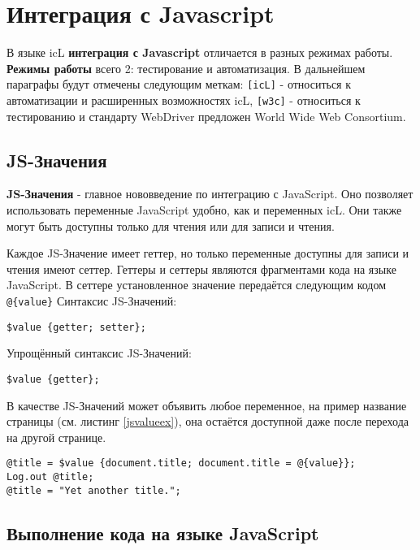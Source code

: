 \section{Интеграция с Javascript}

В языке icL {\bf интеграция с Javascript} отличается в разных режимах работы. {\bf Режимы работы} всего 2: тестирование и автоматизация. В дальнейшем параграфы будут отмечены следующим меткам: \texttt{[icL]} - относиться к автоматизации и расширенных возможностях icL, \texttt{[w3c]} - относиться к тестированию и стандарту WebDriver предложен World Wide Web Consortium.

\subsection{JS-Значения}

{\bf JS-Значения} - главное нововведение по интеграцию с JavaScript. Оно позволяет использовать переменные JavaScript удобно, как и переменных icL. Они также могут быть доступны только для чтения или для записи и чтения.

Каждое JS-Значение имеет геттер, но только переменные доступны для записи и чтения имеют сеттер. Геттеры и сеттеры являются фрагментами кода на языке JavaScript. В сеттере установленное значение передаётся следующим кодом \texttt{@\{value\}} Синтаксис JS-Значений:
\begin{verbatim}
$value {getter; setter};
\end{verbatim}

Упрощённый синтаксис JS-Значений:
\begin{verbatim}
$value {getter};
\end{verbatim}

В качестве JS-Значений может объявить любое переменное, на пример название страницы (см. листинг \ref{jsvalueex}), она остаётся доступной даже после перехода на другой странице.

\begin{sourcecode}
\label{jsvalueex}
\begin{verbatim}
@title = $value {document.title; document.title = @{value}};
Log.out @title;
@title = "Yet another title.";
\end{verbatim}
\end{sourcecode}

\subsection{Выполнение кода на языке JavaScript}

